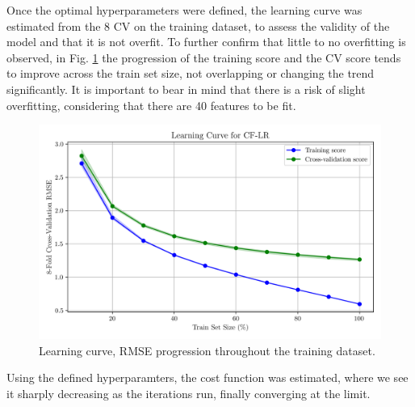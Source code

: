 \documentclass[conference]{IEEEtran}
\begin{document}
Once the optimal hyperparameters were defined, the learning curve was estimated from the 8 CV on the training dataset, to assess the validity of the model and that it is not overfit. To further confirm that little to no overfitting is observed, in Fig. \ref{fig:model01_learning_curve} the progression of the training score and the CV score tends to improve across the train set size, not overlapping or changing the trend significantly. It is important to bear in mind that there is a risk of slight overfitting, considering that there are 40 features to be fit.

\begin{figure}[H]
    \centering
    \includegraphics[width=1\linewidth]{assets/model01_learning_curve.png}
    \caption{Learning curve, RMSE progression throughout the training dataset.}
    \label{fig:model01_learning_curve}
\end{figure}



Using the defined hyperparamters, the cost function was estimated, where we see it sharply decreasing as the iterations run, finally converging at the limit.
\end{document}
